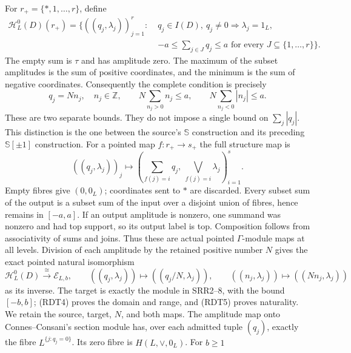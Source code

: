 For $r_+=\{*,1,\ldots,r\}$, define
\begin{equation}\tag{RDT3}
\begin{split}
\mathcal H_L^0(D)(r_+)=\{((q_j,\lambda_j))_{j=1}^r:\;&q_j\in I(D),
\ q_j\ne0\Rightarrow\lambda_j=1_L,\\[-2pt]
&-a\le\sum_{j\in J}q_j\le a
\text{ for every }J\subseteq\{1,\ldots,r\}\}.
\end{split}
\end{equation}
The empty sum is $\tau$ and has amplitude zero. The maximum of the
subset amplitudes is the sum of positive coordinates, and the minimum
is the sum of negative coordinates. Consequently the complete
condition is precisely
\begin{equation}\tag{RDT4}
q_j=Nn_j,\quad n_j\in\mathbb Z,\qquad
N\sum_{n_j>0}n_j\le a,\qquad
N\sum_{n_j<0}|n_j|\le a.
\end{equation}
These are two separate bounds. They do not impose a single bound on
$\sum_j|q_j|$. This distinction is the one between the source's
$\mathbb S$ construction and its preceding
$\mathbb S[\pm1]$ construction.
For a pointed map $f:r_+\to s_+$ the full structure map is
\begin{equation}\tag{RDT5}
((q_j,\lambda_j))_j\longmapsto
\left(\sum_{f(j)=i}q_j,\ \bigvee_{f(j)=i}\lambda_j\right)_{i=1}^s.
\end{equation}
Empty fibres give $(0,0_L)$; coordinates sent to $*$ are discarded.
Every subset sum of the output is a subset sum of the input over a
disjoint union of fibres, hence remains in $[-a,a]$. If an output
amplitude is nonzero, one summand was nonzero and had top support,
so its output label is top. Composition follows from associativity
of sums and joins. Thus these are actual pointed $\Gamma$-module
maps at all levels.
Division of each amplitude by the retained positive number $N$ gives
the exact pointed natural isomorphism
\begin{equation}\tag{RDT6}
\mathcal H_L^0(D)\xrightarrow{\ \cong\ }\mathcal E_{L,b},\qquad
((q_j,\lambda_j))\longmapsto((q_j/N,\lambda_j)),\qquad
((n_j,\lambda_j))\longmapsto((Nn_j,\lambda_j))
\end{equation}
as its inverse. The target is exactly the module in SRR2--8, with
the bound $[-b,b]$; (RDT4) proves the domain and range, and (RDT5)
proves naturality. We retain the source, target, $N$, and both maps.
The amplitude map onto Connes--Consani's section module has, over
each admitted tuple $(q_j)$, exactly the fibre
$L^{\{j:q_j=0\}}$. Its zero fibre is $H(L,\vee,0_L)$. For $b\ge1$

